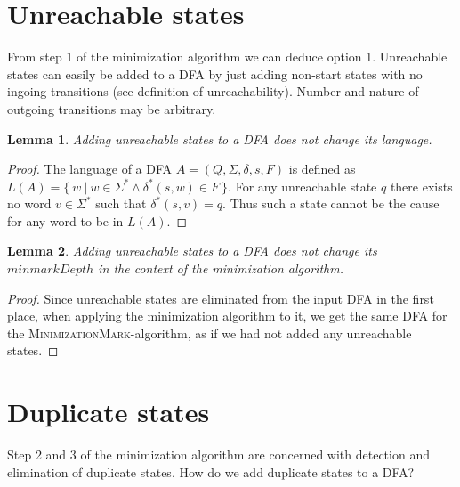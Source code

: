 \documentclass[a4paper, oneside, 11pt]{report}
\newtheorem{lemma}{Lemma}
\theoremstyle{definition}
\newtheorem{definition}{Definition}
\theoremstyle{remark}
\newcommand{\MinMark}{\textsc{MinimizationMark}}
\begin{document}
\section{Unreachable states}

From step 1 of the minimization algorithm we can deduce option 1. Unreachable states can easily be added to a DFA by just adding non-start states with no ingoing transitions (see definition of unreachability). Number and nature of outgoing transitions may be arbitrary.

\begin{lemma}
	Adding unreachable states to a DFA does not change its language.
\end{lemma}
\begin{proof}
	The language of a DFA $A = (Q, \Sigma, \delta, s, F)$ is defined as $L(A) = \{\ w\ |\ w \in \Sigma^* \land \delta^*(s, w) \in F\ \}$. For any unreachable state $q$ there exists no word $v \in \Sigma^*$ such that $\delta^*(s,v) = q$. Thus such a state cannot be the cause for any word to be in $L(A)$.
\end{proof}

\begin{lemma}
	Adding unreachable states to a DFA does not change its $minmarkDepth$ in the context of the minimization algorithm.
\end{lemma}
\begin{proof}
	Since unreachable states are eliminated from the input DFA in the first place, when applying the minimization algorithm to it, we get the same DFA for the \MinMark-algorithm, as if we had not added any unreachable states.
\end{proof}

\section{Duplicate states}


Step 2 and 3 of the minimization algorithm are concerned with detection and elimination of duplicate states. How do we add duplicate states to a DFA?
\end{document}
